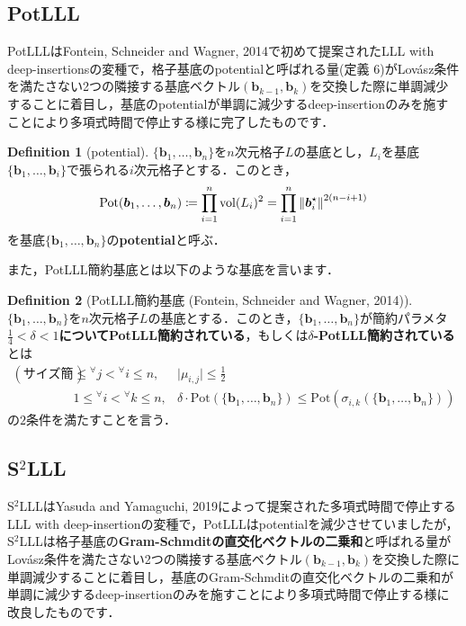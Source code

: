 \documentclass[a4j, dvipdfmx]{jsarticle}
\theoremstyle{definition}
\newtheorem{definition}{Definition}[section]
\begin{document}
\subsection{PotLLL}

PotLLLはFontein, Schneider and Wagner, 2014で初めて提案されたLLL with deep-insertionsの変種で，格子基底のpotentialと呼ばれる量(定義 6)がLovász条件を満たさない2つの隣接する基底ベクトル$(\boldsymbol{b}_{k-1},\boldsymbol{b}_k)$を交換した際に単調減少することに着目し，基底のpotentialが単調に減少するdeep-insertionのみを施すことにより多項式時間で停止する様に完了したものです．

\begin{definition}[potential]
$\{\boldsymbol{b}_1,\ldots,\boldsymbol{b}_n\}$を$n$次元格子$L$の基底とし，$L_i$を基底$\{\boldsymbol{b}_1,\ldots,\boldsymbol{b}_i\}$で張られる$i$次元格子とする．このとき，
$$
\mathrm{Pot}(\boldsymbol{b}_1,\ldots,\boldsymbol{b}_n)\coloneqq \prod_{i=1}^n \mathrm{vol}(L_i)^2=\prod_{i=1}^n \norm{\boldsymbol{b}_i^\star}^{2(n-i+1)}
$$
を基底$\{\boldsymbol{b}_1,\ldots,\boldsymbol{b}_n\}$の\textbf{potential}と呼ぶ．
\end{definition}

また，PotLLL簡約基底とは以下のような基底を言います．

\begin{definition}[PotLLL簡約基底 (Fontein, Schneider and Wagner, 2014)]
$\{\boldsymbol{b}_1,\ldots,\boldsymbol{b}_n\}$を$n$次元格子$L$の基底とする．このとき，$\{\boldsymbol{b}_1,\ldots,\boldsymbol{b}_n\}$が簡約パラメタ\textbf{$\frac{1}{4}<\delta<1$についてPotLLL簡約されている}，もしくは\textbf{$\delta$-PotLLL簡約されている}とは
$$
\begin{array}{lll}
(\textbf{サイズ簡約条件})&\le{}^\forall j<{}^\forall i\le n,&\lvert\mu_{i, j}\rvert\le \frac{1}{2}\\
&1\le{}^\forall i<{}^\forall k\le n,&\delta\cdot \mathrm{Pot}(\lbrace\boldsymbol{b}_1,\ldots,\boldsymbol{b}_n\rbrace)\le\mathrm{Pot}(\sigma_{i, k}(\lbrace\boldsymbol{b}_1,\ldots,\boldsymbol{b}_n\rbrace))\end{array}
$$
の$2$条件を満たすことを言う．
\end{definition}

\subsection{S$\!{}^2$LLL}

S$\!{}^2$LLLはYasuda and Yamaguchi, 2019によって提案された多項式時間で停止するLLL with deep-insertionの変種で，PotLLLはpotentialを減少させていましたが，S$\!{}^2$LLLは格子基底の\textbf{Gram-Schmditの直交化ベクトルの二乗和}と呼ばれる量がLovász条件を満たさない2つの隣接する基底ベクトル$(\boldsymbol{b}_{k-1},\boldsymbol{b}_k)$を交換した際に単調減少することに着目し，基底のGram-Schmditの直交化ベクトルの二乗和が単調に減少するdeep-insertionのみを施すことにより多項式時間で停止する様に改良したものです．
\end{document}
